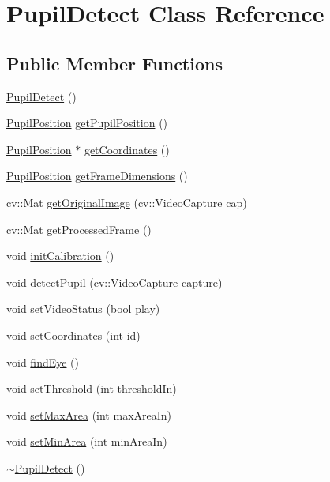 \hypertarget{class_pupil_detect}{}\section{Pupil\+Detect Class Reference}
\label{class_pupil_detect}
\subsection*{Public Member Functions}
\begin{DoxyCompactItemize}
\item 
\mbox{\hyperlink{class_pupil_detect_aa1ace17fac0af12bee24ca0413cc59a0}{Pupil\+Detect}} ()
\item 
\mbox{\hyperlink{struct_pupil_position}{Pupil\+Position}} \mbox{\hyperlink{class_pupil_detect_a95abbcaf36e31ea938ffdbc3402a481a}{get\+Pupil\+Position}} ()
\item 
\mbox{\hyperlink{struct_pupil_position}{Pupil\+Position}} $\ast$ \mbox{\hyperlink{class_pupil_detect_a41e24f18271f8395b1ab5043d70c03ad}{get\+Coordinates}} ()
\item 
\mbox{\hyperlink{struct_pupil_position}{Pupil\+Position}} \mbox{\hyperlink{class_pupil_detect_ae2338ef12da7fd0a0c2f668e25dbec54}{get\+Frame\+Dimensions}} ()
\item 
cv\+::\+Mat \mbox{\hyperlink{class_pupil_detect_a09f63f95f480233d90a648e0a61c8abb}{get\+Original\+Image}} (cv\+::\+Video\+Capture cap)
\item 
cv\+::\+Mat \mbox{\hyperlink{class_pupil_detect_af770df91c51d99bdd1a282e8b9fb6f1b}{get\+Processed\+Frame}} ()
\item 
void \mbox{\hyperlink{class_pupil_detect_aef0256a07774377932e949f2ba460fde}{init\+Calibration}} ()
\item 
void \mbox{\hyperlink{class_pupil_detect_a6c3419d438fde03cc460597257e05446}{detect\+Pupil}} (cv\+::\+Video\+Capture capture)
\item 
void \mbox{\hyperlink{class_pupil_detect_a59eaecc4b0dfb1c380d3c5d5ebf806f0}{set\+Video\+Status}} (bool \mbox{\hyperlink{class_pupil_detect_af956995e72f4c348ae4056aba2112e2b}{play}})
\item 
void \mbox{\hyperlink{class_pupil_detect_a22dc3e6f1496e1f0a79c61433f062cf0}{set\+Coordinates}} (int id)
\item 
void \mbox{\hyperlink{class_pupil_detect_ab1bc03f4007d91e575b349659119c70a}{find\+Eye}} ()
\item 
void \mbox{\hyperlink{class_pupil_detect_a116fb58487a120ee59642c6e97d77134}{set\+Threshold}} (int threshold\+In)
\item 
void \mbox{\hyperlink{class_pupil_detect_a38b91dc58b1a408e7ca081dac2c208bb}{set\+Max\+Area}} (int max\+Area\+In)
\item 
void \mbox{\hyperlink{class_pupil_detect_aa933cccabd0866e4fa1aee000532cb29}{set\+Min\+Area}} (int min\+Area\+In)
\item 
\mbox{\hyperlink{class_pupil_detect_af97e965d47623069188ffdf793248077}{$\sim$\+Pupil\+Detect}} ()
\end{DoxyCompactItemize}
